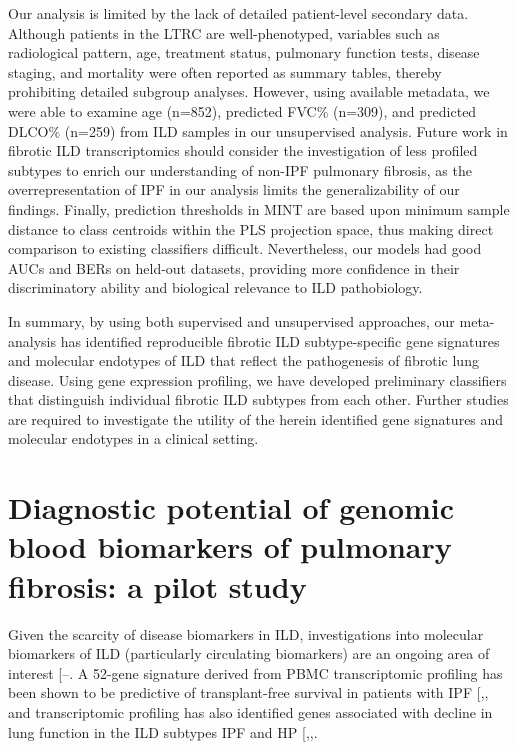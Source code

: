\documentclass[
]{article}
\begin{document}
Our analysis is limited by the lack of detailed patient-level secondary data. Although patients in the LTRC are well-phenotyped, variables such as radiological pattern, age, treatment status, pulmonary function tests, disease staging, and mortality were often reported as summary tables, thereby prohibiting detailed subgroup analyses. However, using available metadata, we were able to examine age (n=852), predicted FVC\% (n=309), and predicted DLCO\% (n=259) from ILD samples in our unsupervised analysis. Future work in fibrotic ILD transcriptomics should consider the investigation of less profiled subtypes to enrich our understanding of non-IPF pulmonary fibrosis, as the overrepresentation of IPF in our analysis limits the generalizability of our findings. Finally, prediction thresholds in MINT are based upon minimum sample distance to class centroids within the PLS projection space, thus making direct comparison to existing classifiers difficult. Nevertheless, our models had good AUCs and BERs on held-out datasets, providing more confidence in their discriminatory ability and biological relevance to ILD pathobiology.

In summary, by using both supervised and unsupervised approaches, our meta-analysis has identified reproducible fibrotic ILD subtype-specific gene signatures and molecular endotypes of ILD that reflect the pathogenesis of fibrotic lung disease. Using gene expression profiling, we have developed preliminary classifiers that distinguish individual fibrotic ILD subtypes from each other. Further studies are required to investigate the utility of the herein identified gene signatures and molecular endotypes in a clinical setting.

\clearpage

\section{Diagnostic potential of genomic blood biomarkers of pulmonary fibrosis: a pilot study}\label{bloodpilot}

\renewcommand{\thefigure}{3.\arabic{figure}}
\setcounter{figure}{0}
\renewcommand{\thetable}{3.\arabic{table}}
\setcounter{table}{0}
\renewcommand{\theequation}{3.\arabic{equation}}
\setcounter{equation}{0}

Given the scarcity of disease biomarkers in ILD, investigations into molecular biomarkers of ILD (particularly circulating biomarkers) are an ongoing area of interest {[}--\citeproc{ref-bowman_proteomic_2022}{99}{]}. A 52-gene signature derived from PBMC transcriptomic profiling has been shown to be predictive of transplant-free survival in patients with IPF {[},\citeproc{ref-herazo-maya_validating_2017}{100}{]}, and transcriptomic profiling has also identified genes associated with decline in lung function in the ILD subtypes IPF and HP {[},,\citeproc{ref-fernandez_perez_prognostic_2022}{102}{]}.
\end{document}
